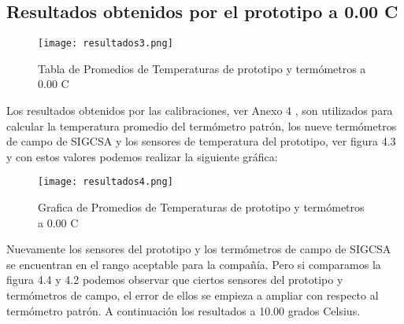 \subsection{Resultados obtenidos por el prototipo a 0.00 C}

\begin{figure}[H]
	\centering
	\texttt{[image: resultados3.png]}
	\caption{Tabla de Promedios de Temperaturas de prototipo y termómetros a 0.00 C}
\end{figure}

\par \noindent 
Los resultados obtenidos por las calibraciones, ver Anexo 4 , son utilizados para calcular la temperatura promedio del termómetro patrón, los nueve termómetros de campo de SIGCSA y los sensores de temperatura del prototipo, ver figura 4.3 y con estos valores podemos realizar la siguiente gráfica:

\begin{figure}[H]
	\centering
	\texttt{[image: resultados4.png]}
	\caption{Grafica de Promedios de Temperaturas de prototipo y termómetros a 0.00 C}
\end{figure}

\par \noindent
Nuevamente los sensores del prototipo y los termómetros de campo de SIGCSA se encuentran en el rango aceptable para la compañía. Pero si comparamos la figura 4.4 y 4.2 podemos observar que ciertos sensores del prototipo y termómetros de campo, el error de ellos se empieza a ampliar con respecto al termómetro patrón. A continuación los resultados a 10.00 grados Celsius.
